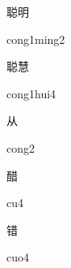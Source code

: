 \begin{multicols*}{2}
\begin{verbete}{聪明}
\begin{pronuncia}{cong1ming2}
\end{pronuncia}
\end{verbete}

\begin{verbete}{聪慧}
\begin{pronuncia}{cong1hui4}
\end{pronuncia}
\end{verbete}

\begin{verbete}[cong2]{从}
\begin{pronuncia}{cong2}
\end{pronuncia}
\end{verbete}

\begin{verbete}[cu4]{醋}
\begin{pronuncia}{cu4}
\end{pronuncia}
\end{verbete}

\begin{verbete}[cuo4]{错}
\begin{pronuncia}{cuo4}
\end{pronuncia}
\end{verbete}

\end{multicols*}
